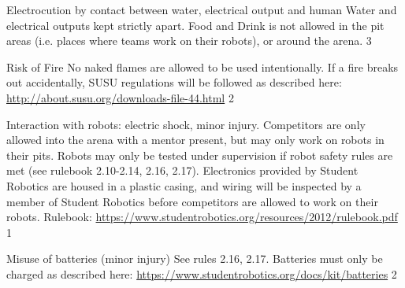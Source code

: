 \documentclass[12pt,a4paper]{scrartcl}
\begin{document}
{Electrocution by contact between water, electrical output and human}
{Water and electrical outputs kept strictly apart. Food and Drink is not allowed in the pit areas (i.e. places where teams work on their robots), or around the arena.}
{3}

{Risk of Fire}
{No naked flames are allowed to be used intentionally. If a fire breaks out accidentally, SUSU regulations will be followed as described here: \url{http://about.susu.org/downloads-file-44.html}}
{2}

{Interaction with robots: electric shock, minor injury.}
{Competitors are only allowed into the arena with a mentor present, but may only work on robots in their pits. Robots may only be tested under supervision if robot safety rules are met (see rulebook 2.10-2.14, 2.16, 2.17). Electronics provided by Student Robotics are housed in a plastic casing, and wiring will be inspected by a member of Student Robotics before competitors are allowed to work on their robots.  Rulebook: \url{https://www.studentrobotics.org/resources/2012/rulebook.pdf}}
{1}

{Misuse of batteries (minor injury)}
{See rules 2.16, 2.17. Batteries must only be charged as described here:
\url{https://www.studentrobotics.org/docs/kit/batteries}}
{2}
\end{document}
